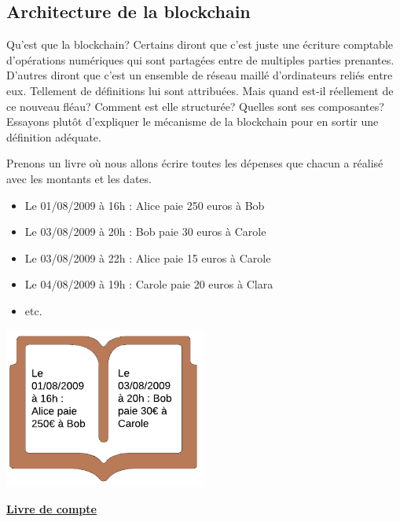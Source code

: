 \documentclass[12pt]{report}
\begin{document}

\newpage
  \subsection{Architecture de la blockchain}

\hspace{1cm} Qu'est que la blockchain? Certains diront que c'est juste une écriture comptable d'opérations numériques qui sont partagées entre de multiples parties prenantes. D'autres diront que c'est un ensemble de réseau maillé d'ordinateurs reliés entre eux. Tellement de définitions lui sont attribuées. Mais quand est-il réellement de ce nouveau fléau? Comment est elle structurée? Quelles sont ses composantes? Essayons plutôt d'expliquer le mécanisme de la blockchain pour en sortir une définition adéquate.

\hspace{1cm} Prenons un livre où nous allons écrire toutes les dépenses que chacun a réalisé avec les montants et les dates.

\begin{itemize}
    \item Le 01/08/2009 à 16h : Alice paie 250 euros à Bob 
    \item Le 03/08/2009 à 20h : Bob paie 30 euros à Carole
    \item Le 03/08/2009 à 22h : Alice paie 15 euros  à Carole
    \item Le 04/08/2009 à 19h : Carole paie 20 euros  à Clara
    \item etc.
\end{itemize}

\begin{center}
    \includegraphics[width=0.5\textwidth]{livre_compte}

    \textbf{\underline{Livre de compte}} \\[1cm]
\end{center}
\end{document}
